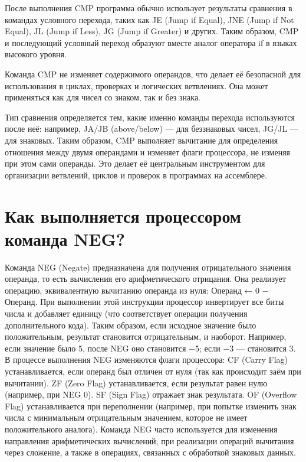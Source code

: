 После выполнения CMP программа обычно использует результаты сравнения в командах условного перехода, таких как JE (Jump if Equal), JNE (Jump if Not Equal), JL (Jump if Less), JG (Jump if Greater) и других.
Таким образом, CMP и последующий условный переход образуют вместе аналог оператора if в языках высокого уровня.

Команда CMP не изменяет содержимого операндов, что делает её безопасной для использования в циклах, проверках и логических ветвлениях. 
Она может применяться как для чисел со знаком, так и без знака.

Тип сравнения определяется тем, какие именно команды перехода используются после неё: например, JA/JB (above/below) — для беззнаковых чисел, JG/JL — для знаковых.
Таким образом, CMP выполняет вычитание для определения отношения между двумя операндами и изменяет флаги процессора, не изменяя при этом сами операнды.
Это делает её центральным инструментом для организации ветвлений, циклов и проверок в программах на ассемблере.

\section{Как выполняется процессором команда NEG?}

Команда NEG (Negate) предназначена для получения отрицательного значения операнда, то есть вычисления его арифметического отрицания.
Она реализует операцию, эквивалентную вычитанию операнда из нуля:
Операнд ← 0 − Операнд.
При выполнении этой инструкции процессор инвертирует все биты числа и добавляет единицу (что соответствует операции получения дополнительного кода).
Таким образом, если исходное значение было положительным, результат становится отрицательным, и наоборот.
Например, если значение было 5, после NEG оно становится −5; если −3 — становится 3.
В процессе выполнения NEG изменяются флаги процессора:
CF (Carry Flag) устанавливается, если операнд был отличен от нуля (так как происходит заём при вычитании).
ZF (Zero Flag) устанавливается, если результат равен нулю (например, при NEG 0).
SF (Sign Flag) отражает знак результата.
OF (Overflow Flag) устанавливается при переполнении (например, при попытке изменить знак числа с минимальным отрицательным значением, которое не имеет положительного аналога).
Команда NEG часто используется для изменения направления арифметических вычислений, при реализации операций вычитания через сложение, а также в операциях, связанных с обработкой знаковых данных.

